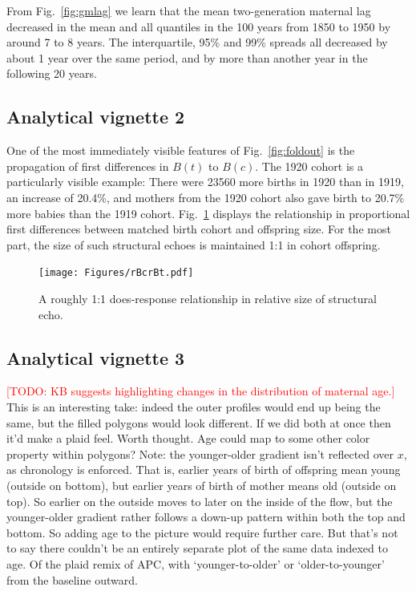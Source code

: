 \documentclass{article}
\newcommand\todo[1]{\textcolor{red}{[TODO: #1]}}
\begin{document}
From Fig.~\ref{fig:gmlag} we learn that the mean two-generation maternal lag decreased in the mean and all quantiles in the 100 years from 1850 to 1950 by around 7 to 8 years. The interquartile, 95\% and 99\% spreads all decreased by about 1 year over the same period, and by more than another year in the following 20 years.

\subsection{Analytical vignette 2}
One of the most immediately visible features of Fig.~\ref{fig:foldout} is the propagation of first differences in $B(t)$ to $B(c)$. The 1920 cohort is a particularly visible example: There were 23560 more births in 1920 than in 1919, an increase of 20.4\%, and mothers from the 1920 cohort also gave birth to 20.7\% more babies than the 1919 cohort. Fig.~\ref{fig:rBcrBt} displays the relationship in proportional first differences between matched birth cohort and offspring size. For the most part, the size of such structural echoes is maintained 1:1 in cohort offspring.


\begin{figure}
\texttt{[image: Figures/rBcrBt.pdf]}
\caption{A roughly 1:1 does-response relationship in relative size of structural echo.}
\label{fig:rBcrBt}
\end{figure}

\subsection{Analytical vignette 3}
\todo{KB suggests highlighting changes in the distribution of maternal age.} This is an interesting take: indeed the outer profiles would end up being the same, but the filled polygons would look different. If we did both at once then it'd make a plaid feel. Worth thought. Age could map to some other color property within polygons? Note: the younger-older gradient isn't reflected over $x$, as chronology is enforced. That is, earlier years of birth of offspring mean young (outside on bottom), but earlier years of birth of mother means old (outside on top). So earlier on the outside moves to later on the inside of the flow, but the younger-older gradient rather follows a down-up pattern within both the top and bottom. So adding age to the picture would require further care. But that's not to say there couldn't be an entirely separate plot of the same data indexed to age. Of the plaid remix of APC, with `younger-to-older' or `older-to-younger' from the baseline outward. 
\end{document}

